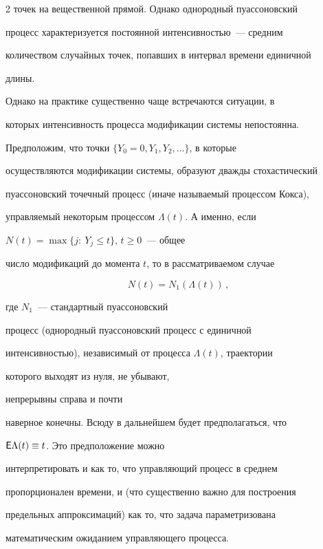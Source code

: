 \begin{multicols}{2}
точек на вещественной прямой. Однако однородный пуассоновский


процесс характеризуется постоянной интенсивностью~--- средним


количеством случайных точек, попавших в интервал времени единичной


длины.





Однако на практике существенно чаще встречаются ситуации, в


которых интенсивность процесса модификации системы непостоянна.





Предположим, что точки $\{Y_0=0,Y_1,Y_2,\ldots\}$, в которые


осуществляются модификации системы, образуют дважды стохастический


пуассоновский точечный процесс (иначе называемый процессом Кокса),


управляемый некоторым процессом $\Lambda(t)$. А именно, если


$


N(t)=\max\{j:\ Y_j\le t\}$, $t\ge0$~--- общее


число модификаций до момента $t$, то в рассматриваемом случае


$$


N(t)=N_1(\Lambda(t))\,,


$$


где $N_1$~--- стандартный пуассоновский


процесс (однородный пуассоновский процесс с единичной


интен\-сив\-ностью), независимый от процесса $\Lambda(t)$, траектории


которого выходят из нуля, не убывают, %


непрерывны справа и почти


наверное конечны. Всюду в дальнейшем будет предполагаться, что


${\sf E}\Lambda(t)\equiv t$. Это предположение можно


интерпретировать и как то, что управляющий процесс в среднем


пропорционален времени, и (что существенно важно для построения


предельных аппроксимаций) как то, что задача параметризована


математическим ожиданием управляющего процесса.






\end{multicols}
